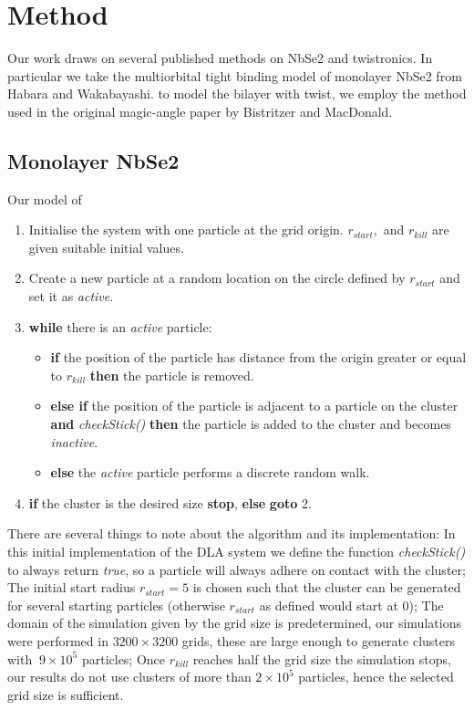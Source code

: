 \documentclass[10pt, twocolumn]{article} %
\begin{document}
\section*{Method}
  Our work draws on several published methods on NbSe2 and twistronics. In particular we take the multiorbital tight binding model of monolayer NbSe2 from Habara and Wakabayashi\cite{Habara_2021}. to model the bilayer with twist, we employ the method used in the original magic-angle paper by Bistritzer and MacDonald.

\subsection*{Monolayer NbSe2}
  Our model of  

  \begin{enumerate}
    \item Initialise the system with one particle at the grid origin. $r_{start},$ and $r_{kill}$ are given suitable initial values.
    \item Create a new particle at a random location on the circle defined by $r_{start}$ and set it as \textit{active}.
    \item \textbf{while} there is an \textit{active} particle:
    \begin{itemize}
      \item \textbf{if} the position of the particle has distance from the origin greater or equal to $r_{kill}$ \textbf{then} the particle is removed.
      \item \textbf{else if} the position of the particle is adjacent to a particle on the cluster \textbf{and} \textit{checkStick()} \textbf{then} the particle is added to the cluster and becomes \textit{inactive}.
      \item \textbf{else} the \textit{active} particle performs a discrete random walk.
    \end {itemize}
  \item \textbf{if} the cluster is the desired size \textbf{stop}, \textbf{else} \textbf{goto} 2.
  \end{enumerate}

  There are several things to note about the algorithm and its implementation: In this initial implementation of the DLA system we define the function \textit{checkStick()} to always return \textit{true}, so a particle will always adhere on contact with the cluster; The initial start radius $r_{start} = 5$ is chosen such that the cluster can be generated for several starting particles (otherwise $r_{start}$ as defined would start at 0); The domain of the simulation given by the grid size is predetermined, our simulations were performed in $3200 \times 3200$ grids, these are large enough to generate clusters with $~9\times10^5$ particles; Once $r_{kill}$ reaches half the grid size the simulation stops, our results do not use clusters of more than $2\times10^5$ particles, hence the selected grid size is sufficient.
\end{document}
